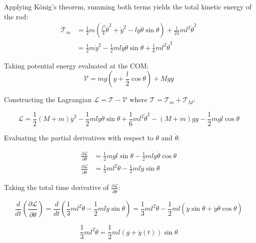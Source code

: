 Applying König's theorem, summing both terms yields the total kinetic energy of the rod:
\begin{align}
    \mathcal{T}_m &=
        \frac{1}{2}m\left( \frac{l^2}{4}\dot{\theta}^2 + \dot{y}^2 - l\dot{y}\dot{\theta}\sin\theta \right) + \frac{1}{24}ml^2\dot{\theta}^2 \\
        &= \frac{1}{2}m\dot{y}^2 - \frac{1}{2}ml\dot{y}\dot{\theta}\sin\theta + \frac{1}{6}ml^2\dot{\theta}^2
\end{align}

Taking potential energy evaluated at the COM:
\begin{equation}
    \mathcal{V} = mg\left(y + \frac{l}{2}\cos\theta\right) + Mgy
\end{equation}

Constructing the Lagrangian $\mathcal{L} = \mathcal{T} - \mathcal{V}$ where $\mathcal{T} = \mathcal{T}_m + \mathcal{T}_M$:

\begin{equation}
\mathcal{L} = \frac{1}{2}(M+m)\dot{y}^2 - \frac{1}{2}ml\dot{y}\dot{\theta}\sin\theta + \frac{1}{6}ml^2\dot{\theta}^2 - (M+m)gy - \frac{1}{2}mgl\cos\theta
\end{equation}

Evaluating the partial derivatives with respect to $\theta$ and $\dot{\theta}$:

\begin{align}
\frac{\partial \mathcal{L}}{\partial \theta} &= \frac{1}{2}mgl\sin\theta - \frac{1}{2}ml\dot{y}\dot{\theta}\cos\theta \\
\frac{\partial \mathcal{L}}{\partial \dot{\theta}} &= \frac{1}{3}ml^2\dot{\theta} - \frac{1}{2}ml\dot{y}\sin\theta
\end{align}

Taking the total time derivative of $\frac{\partial \mathcal{L}}{\partial \dot{\theta}}$:

\begin{equation}
    \frac{d}{dt}\left(\frac{\partial \mathcal{L}}{\partial \dot{\theta}}\right) =
    \frac{d}{dt}\left( \frac{1}{3}ml^2\dot{\theta} - \frac{1}{2}ml\dot{y}\sin\theta \right) =
    \frac{1}{3}ml^2\ddot{\theta} - \frac{1}{2}ml\left( \ddot{y}\sin\theta + \dot{y}\dot{\theta}\cos\theta \right)
\end{equation}

\begin{equation}
    \frac{1}{3}ml^2\ddot{\theta} = \frac{1}{2}ml\left( g + \ddot{y}(t) \right) \sin\theta
\end{equation}

